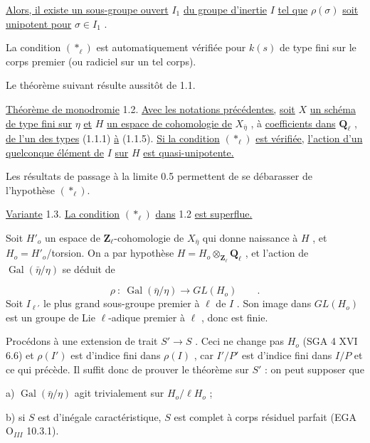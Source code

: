 \underline{Alors, il existe un sous-groupe ouvert}  $I_1$  \underline{du groupe d'inertie}  $I$  \underline{tel que}  $\rho(\sigma)$  \underline{soit unipotent pour}  $\sigma \in I_1$ .

La condition  $(*_\ell)$  est automatiquement vérifiée pour  $k(s)$  de type fini sur le corps premier (ou radiciel sur un tel corps).

Le théorème suivant résulte aussitôt de 1.1.

\underline{Théorème de monodromie} 1.2.  \underline{Avec les notations précédentes,} \underline{soit}  $X$  \underline{un schéma de type fini sur}  $\eta$  \underline{et}  $H$  \underline{un espace de cohomologie de}  $X_{\bar\eta}$ , à \underline{coefficients dans}  $\mathbf{Q}_\ell$ , \underline{de  l'un des types} (1.1.1) \underline{à} (1.1.5). \underline{Si la condition}  $(*_\ell)$  \underline{est vérifiée,} \underline{l'action d'un quelconque élément de}  $I$  \underline{sur}  $H$  \underline{est quasi-unipotente.}

Les résultats de passage à la limite 0.5 permettent de se débarasser de l'hypothèse  $(*_\ell)$.

\underline{Variante} 1.3.  \underline{La condition}  $(*_\ell)$  \underline{dans} 1.2 \underline{est superflue.}

Soit  $H'_o$  un espace de  $\mathbf{Z}_\ell$-cohomologie de  $X_{\bar\eta}$  qui donne naissance à  $H$ , et  $H_o = H'_o$/torsion. On a par hypothèse  $H = H_o \otimes_{\mathbf{Z}_\ell} \mathbf{Q}_\ell$ , et l'action de  $\operatorname{Gal}(\bar\eta/\eta)$  se déduit de

\begin{equation*}
\rho \ : \ \operatorname{Gal}(\bar\eta/\eta) \longrightarrow GL(H_o) \qquad .
\end{equation*}
Soit  $I_{\ell'}$  le plus grand sous-groupe premier à  $\ell$ de  $I$ . Son image dans  $GL(H_o)$  est un groupe de Lie $\ell$-adique premier à  $\ell$ , donc est finie.

Procédons à une extension de trait  $S' \longrightarrow S$ . Ceci ne change pas  $H_o$ (SGA 4 XVI 6.6)  et  $\rho(I')$  est d'indice fini dans  $\rho(I)$ , car  $I'/P'$  est d'indice fini dans  $I/P$  et ce qui précède. Il suffit donc de prouver le théorème sur  $S'$ : on peut supposer que

a) $\operatorname{Gal}(\bar\eta/\eta)$  agit trivialement sur  $H_o/\ell H_o$  ;

b) si  $S$  est d'inégale caractéristique,  $S$  est complet à corps résiduel parfait (EGA $\mathrm{O}_{III}$  10.3.1).

